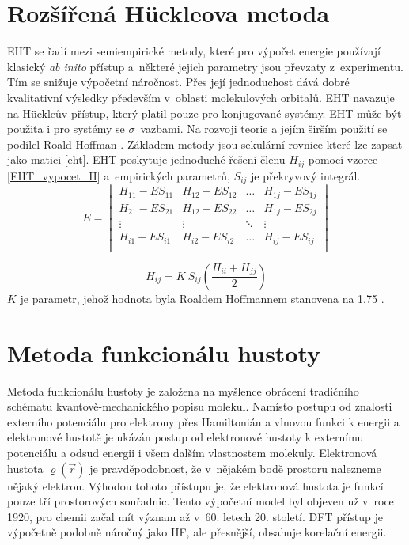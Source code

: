 \documentclass[
  printed, %
  table,   %
  lof,     %
  lot,     %
  oneside,
]{fithesis3}
\begin{document}
\section{Rozšířená Hückleova metoda}
EHT se řadí mezi semiempirické metody, které  pro výpočet energie používají klasický \textit{ab inito} přístup a~některé jejich parametry jsou převzaty z~experimentu. Tím se snižuje výpočetní náročnost. Přes její jednoduchost dává dobré kvalitativní výsledky především v~oblasti molekulových orbitalů. EHT navazuje na Hückleův přístup, který platil pouze pro konjugované systémy. EHT může být použita i pro systémy se $\sigma$~vazbami. Na rozvoji teorie a jejím širším použití se podílel Roald Hoffman \cite{lowe2011quantum}. Základem metody jsou sekulární rovnice které lze zapsat jako matici \ref{eht}. EHT poskytuje jednoduché řešení členu $H_{ij}$ pomocí vzorce \ref{EHT_vypocet_H} a~empirických parametrů, $S_{ij}$ je překryvový integrál.
\begin{equation}
E = \begin{vmatrix}
H_{11} - E S_{11} & H_{12} - E S_{12} & \dots & H_{1j} - E S_{1j} \\
H_{21} - E S_{21} & H_{12} - E S_{22} & \dots & H_{1j} - E S_{2j} \\
\vdots & \vdots &  \ddots & \vdots  \\
H_{i1} - E S_{i1} & H_{i2} - E S_{i2} & \dots & H_{ij} - E S_{ij} \\
\end{vmatrix}
\label{eht}
\end{equation}


\begin{equation}
H_{ij} = K~S_{ij} \left( \frac{H_{ii} + H_{jj}}{2} \right)
\label{EHT_vypocet_H}
\end{equation}
$K$ je parametr, jehož hodnota byla Roaldem Hoffmannem stanovena na 1,75 \cite{lowe2011quantum}.

\section{Metoda funkcionálu hustoty}
Metoda funkcionálu hustoty je založena na myšlence obrácení tradičního schématu kvantově-mechanického popisu molekul. Namísto postupu od znalosti externího potenciálu pro elektrony přes Hamiltonián a vlnovou funkci k energii a elektronové hustotě je ukázán postup od elektronové hustoty k externímu potenciálu a odsud energii i všem dalším vlastnostem molekuly.   Elektronová hustota $\varrho(\vec{r})$ je pravděpodobnost, že v~nějakém bodě prostoru nalezneme nějaký elektron.  Výhodou tohoto přístupu je, že elektronová hustota je funkcí pouze tří prostorových souřadnic. Tento výpočetní model byl objeven už v~roce 1920, pro chemii začal mít význam až v~60. letech 20. století. DFT přístup je výpočetně podobně náročný jako HF, ale přesnější, obsahuje korelační energii. \\
\end{document}
